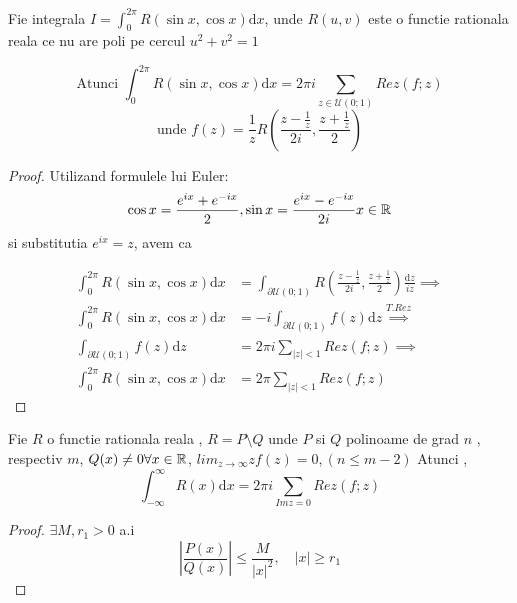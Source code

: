 \begin{tip}[1]
    Fie integrala $\displaystyle I=\int_{0}^{2\pi} R(\sin x, \cos x) \mathrm{d} x$, unde
    $R(u,v)$ este o functie rationala reala ce nu are poli pe cercul $u^2+v^2=1$

	\[
        \text{Atunci } \int_{0}^{2\pi} R(\sin x , \cos x) \mathrm{d} x =
        2\pi i \sum_{z\in \mathcal{U}(0;1)} Rez(f;z)
    \]
    \[
        \text{unde } f(z) = \frac{1}{z} R\left(\frac{z-\frac{1}{z}}{2i}, \frac{z+\frac{1}{z}}{2} \right)
    \]

    \begin{proof}
        Utilizand formulele lui Euler:
        \[
            \cos x = \frac{e^{ix}+e^{-ix}}{2}, \sin x = \frac{e^{ix}-e^{-ix}}{2i} x \in \mathbb{R}
        \]
        si substitutia $e^{ix}=z$, avem ca

        \begin{align*}
            \int_{0}^{2\pi} R(\sin x , \cos x) \mathrm{d} x &=
                \int_{\partial \mathcal{U}(0;1)}
                    R\left(\frac{z-\frac{1}{z}}{2i}, \frac{z+\frac{1}{z}}{2} \right)
                \frac{\mathrm{d} z}{iz}            
            \implies 
						\\
						\int_{0}^{2\pi} R(\sin x , \cos x) \mathrm{d} x 
							&= -i \int_{\partial \mathcal{U}(0;1)} f(z) \mathrm{d}z            
            \overset{T.Rez}{\implies}
						\\
						\int_{\partial \mathcal{U}(0;1)} f(z) \mathrm{d}z &=
                2\pi i \sum_{|z|<1} Rez(f;z)            
            \implies 
						\\
						\int_{0}^{2\pi} R(\sin x , \cos x) \mathrm{d} x &=
                2\pi \sum_{|z|<1} Rez(f;z)
        \end{align*}


    \end{proof}
\end{tip}


\begin{tip}
    Fie $R$ o functie rationala reala , $R=P\setminus Q$ unde $P$ si $Q$ polinoame de
    grad $n$ , respectiv $m$, $Q(x)\neq 0 \forall x\in \mathbb{R}$,
    $lim_{z\to\infty} z f(z) =0, (n \leq m-2)$
    Atunci ,
    \[
        \int_{-\infty}^{\infty} R(x) \mathrm{d} x = 2\pi i \sum_{Im z = 0} Rez(f;z)
    \]
    \begin{proof}
        $\exists M,r_1 >0 $ a.i
        \[
            \left|\frac{P(x)}{Q(x)} \right| \leq \frac{M}{|x|^2} , \quad |x| \geq r_1
        \]
    \end{proof}
\end{tip}
